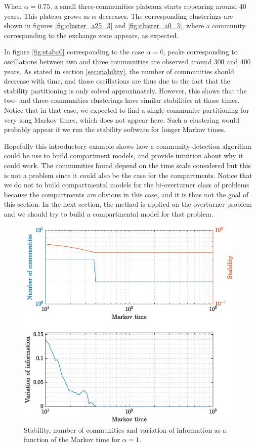 When $\alpha = 0.75$, a small three-communities plateaux starts appearing around 40 years. This plateau grows as $\alpha$ decreases. The corresponding clusterings are shown in figures \ref{fig:cluster_a25_3} and \ref{fig:cluster_a0_3}, where a community corresponding to the exchange zone appears, as expected.

In figure \ref{fig:staba0} corresponding to the case $\alpha = 0$, peaks corresponding to oscillations between two and three communities are observed around 300 and 400 years. As stated in section \ref{sec:stability}, the number of communities should decrease with time, and those oscillations are thus due to the fact that the stability partitioning is only solved approximately. However, this shows that the two- and three-communities clusterings have similar stabilities at those times. Notice that in that case, we expected to find a single-community partitioning for very long Markov times, which does not appear here. Such a clustering would probably appear if we run the stability software for longer Markov times.

Hopefully this introductory example shows how a community-detection algorithm could be use to build compartment models, and provide intuition about why it could work. The communities found depend on the time scale considered but this is not a problem since it could also be the case for the compartments. Notice that we do not to build compartmental models for the bi-overturner class of problems because the compartments are obvious in this case, and it is thus not the goal of this section. In the next section, the method is applied on the overturner problem and we should try to build a compartmental model for that problem. 

\begin{figure}[!htp]
	\centering
	\includegraphics[width = .7\textwidth, height = .4\textheight]{fig/problem2box/stab_a1.eps}
	\caption{Stability, number of communities and variation of information as a function of the Markov time for $\alpha = 1$.}
	\label{fig:staba1}
\end{figure}

